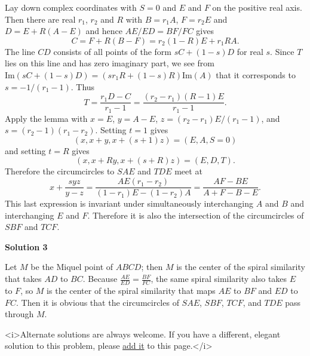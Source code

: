 \begin{enumerate}
 Lay down complex coordinates with $S = 0$ and $E$ and $F$ on the positive real axis. Then there are real $r_1$, $r_2$ and $R$ with $B = r_1A$, $F = r_2E$ and $D = E + R(A - E)$ and hence $AE/ED = BF/FC$ gives
 \[C = F + R(B - F) = r_2(1 - R)E + r_1RA.\]The line $CD$ consists of all points of the form $sC + (1 - s)D$ for real $s$. Since $T$ lies on this line and has zero imaginary part, we see from $\text{Im}(sC + (1 - s)D) = (sr_1R + (1 - s)R)\text{Im}(A)$ that it corresponds to $s = -1/(r_1 - 1)$. Thus
 \[T = \frac{r_1D - C}{r_1 - 1} = \frac{(r_2 - r_1)(R - 1)E}{r_1 - 1}.\]Apply the lemma with $x = E$, $y = A - E$, $z = (r_2 - r_1)E/(r_1 - 1)$, and $s = (r_2 - 1)(r_1 - r_2)$. Setting $t = 1$ gives
 \[(x, x + y, x + (s + 1)z) = (E, A, S = 0)\]and setting $t = R$ gives
 \[(x, x + Ry, x + (s + R)z) = (E, D, T).\]Therefore the circumcircles to $SAE$ and $TDE$ meet at
 \[x + \frac{syz}{y - z} = \frac{AE(r_1 - r_2)}{(1 - r_1)E - (1 - r_2)A} = \frac{AF - BE}{A + F - B - E}.\]This last expression is invariant under simultaneously interchanging $A$ and $B$ and interchanging $E$ and $F$. Therefore it is also the intersection of the circumcircles of $SBF$ and $TCF$.

 



\textbf{Solution 3}

Let $M$ be the Miquel point of $ABCD$; then $M$ is the center of the spiral similarity that takes $AD$ to $BC$. Because $\frac{AE}{ED} = \frac{BF}{FC}$, the same spiral similarity also takes $E$ to $F$, so $M$ is the center of the spiral similarity that maps $AE$ to $BF$ and $ED$ to $FC$. Then it is obvious that the circumcircles of $SAE$, $SBF$, $TCF$, and $TDE$ pass through $M$.

 <i>Alternate solutions are always welcome. If you have a different, elegant solution to this problem, please \href{https://artofproblemsolving.com/wiki/index.php?title=2006\_USAMO\_Problems/Problem\_6&action=edit}{add it} to this page.</i>



\end{enumerate}